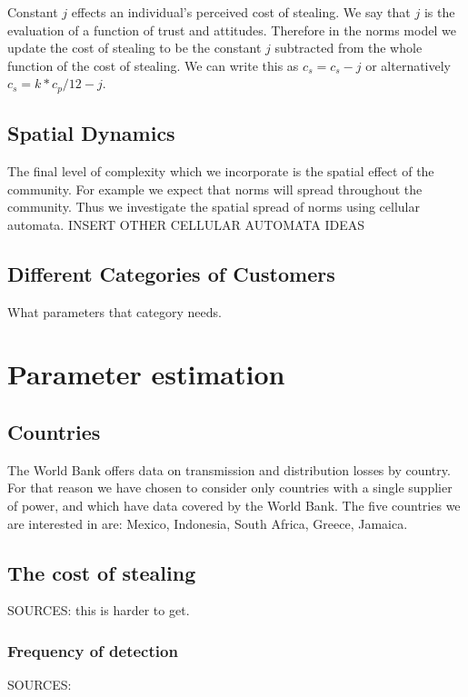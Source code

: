 \documentclass{article}
\begin{document}
Constant $j$ effects an individual's perceived cost of stealing. We say that $j$ is the evaluation of a function of trust and attitudes. Therefore in the norms model we update the cost of stealing to be the constant $j$ subtracted from the whole function of the cost of stealing. We can write this as $c_s=c_s-j$ or alternatively
 $c_s=k*c_p/12 - j$.
                                                                                                                                                                                                                                           \\

\subsection{Spatial Dynamics}
The final level of complexity which we incorporate is the spatial effect of the community. For example we expect that norms will spread throughout the community. Thus we investigate the spatial spread of norms using cellular automata. 
INSERT OTHER CELLULAR AUTOMATA IDEAS 

\subsection{Different Categories of Customers}
What parameters that category needs. 

\section{Parameter estimation}

\subsection{Countries}
The World Bank offers data on transmission and distribution losses by country. For that reason we have chosen to consider only countries with a single supplier of power, and which have data covered by the World Bank.  The five countries we are interested in are: Mexico, Indonesia, South Africa, Greece, Jamaica. 


\subsection{The cost of stealing}
SOURCES:  this is harder to get. 
\subsubsection{Frequency of detection}
SOURCES: 
\end{document}
